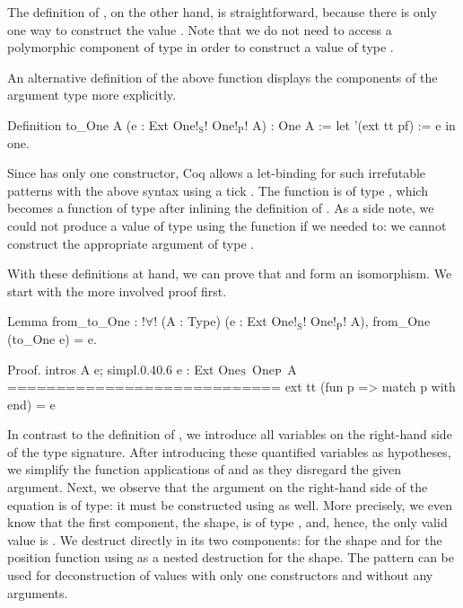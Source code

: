 The definition of , on the other hand, is straightforward, because there is only one way to construct the value .
Note that we do not need to access a polymorphic component of type  in order to construct a value of type .

An alternative definition of the above function displays the components of the argument type  more explicitly.

\begin{coqcode}
Definition to_One A (e : Ext One!$_\text{S}$! One!$_\text{P}$! A) : One A :=
  let '(ext tt pf) := e in one.
\end{coqcode}

Since  has only one constructor, Coq allows a let\--binding for such irrefutable patterns with the above syntax using a tick .
The function  is of type , which becomes a function of type  after inlining the definition of .
As a side note, we could not produce a value of type  using the function  if we needed to: we cannot construct the appropriate argument of type .

With these definitions at hand, we can prove that  and  form an isomorphism.
We start with the more involved proof  first.

\begin{coqcode}
Lemma from_to_One : !$\forall$! (A : Type) (e : Ext One!$_\text{S}$! One!$_\text{P}$! A),
    from_One (to_One e) = e.
\end{coqcode}

\begin{cproof1}{Proof. intros A e; simpl.}{0.4}{0.6}
  e : Ext One\(\sb{\text{S}}\) One\(\sb{\text{P}}\) A
  ============================
  ext tt (fun p => match p with end) = e
\end{cproof1}

In contrast to the definition of , we introduce all variables on the right\--hand side of the type signature.
After introducing these quantified variables as hypotheses, we simplify the function applications of  and  as they disregard the given argument.
Next, we observe that the argument  on the right\--hand side of the equation is of type: it must be constructed using  as well.
More precisely, we even know that the first component, the shape, is of type , and, hence, the only valid value is .
We destruct  directly in its two components:  for the shape and  for the position function using \cinl{[]} as a nested destruction for the shape.
The pattern \cinl{[]} can be used for deconstruction of values with only one constructors and without any arguments.

